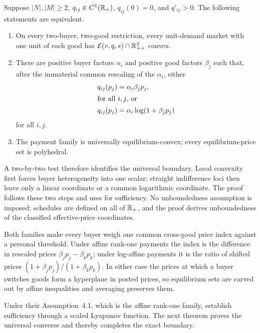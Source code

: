 \begin{theorem}\label{thm:geometry}
Suppose $|N|,|M|\ge2$, $q_{ij}\in C^1(\mathbb{R}_+)$, $q_{ij}(0)=0$, and $q'_{ij}>0$. The following statements are equivalent.
\begin{enumerate}[label=(\roman*),leftmargin=2.2em]
\item On every two-buyer, two-good restriction, every unit-demand market with one unit of each good has $\mathcal{E}(v,q,s)\cap\mathbb{R}_{++}^2$ convex.
\item There are positive buyer factors $\alpha_i$ and positive good factors $\beta_j$ such that, after the immaterial common rescaling of the $\alpha_i$, either
\begin{align}
q_{ij}(p_j)&=\alpha_i\beta_jp_j, \label{eq:affine-family}\\
\intertext{for all $i,j$, or}
q_{ij}(p_j)&=\alpha_i\log(1+\beta_jp_j) \label{eq:log-family}
\end{align}
for all $i,j$.
\item The payment family is universally equilibrium-convex; every equilibrium-price set is polyhedral.
\end{enumerate}
\end{theorem}

A two-by-two test therefore identifies the universal boundary. Local convexity first forces buyer heterogeneity into one scalar; straight indifference loci then leave only a linear coordinate or a common logarithmic coordinate. The proof follows these two steps and uses  for sufficiency. No unboundedness assumption is imposed: schedules are defined on all of $\mathbb{R}_+$, and the proof derives unboundedness of the classified effective-price coordinates.

Both families make every buyer weigh one common cross-good price index against a personal threshold. Under affine rank-one payments the index is the difference in rescaled prices $\beta_jp_j-\beta_kp_k$; under log-affine payments it is the ratio of shifted prices $(1+\beta_jp_j)/(1+\beta_kp_k)$. In either case the prices at which a buyer switches goods form a hyperplane in posted prices, so equilibrium sets are carved out by affine inequalities and averaging preserves them.

Under their Assumption~4.1, which is the affine rank-one family, \citet[Theorem~6.4]{okisato2026} establish sufficiency through a scaled Lyapunov function. The next theorem proves the universal converse and thereby completes the exact boundary.

